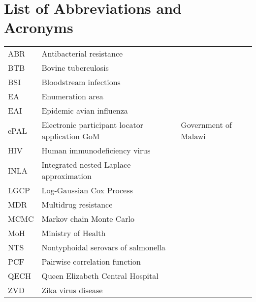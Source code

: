 
\chapter*{List of Abbreviations and Acronyms}

\begin{table}[H]
 \renewcommand{\arraystretch}{1.5}
\begin{tabular}{l l l}
ABR & Antibacterial resistance\\
BTB & Bovine tuberculosis\\
BSI &  Bloodstream infections\\
EA & Enumeration area\\
EAI & Epidemic avian influenza\\
ePAL & Electronic participant locator application
GoM & Government of Malawi\\
HIV & Human immunodeficiency virus\\
INLA & Integrated nested Laplace approximation\\
LGCP &  Log-Gaussian Cox Process\\
MDR & Multidrug resistance\\
MCMC & Markov chain Monte Carlo\\
MoH & Ministry of Health\\
NTS & Nontyphoidal serovars of salmonella\\
PCF & Pairwise correlation function\\
QECH & Queen Elizabeth Central Hospital\\
ZVD & Zika virus disease\\
\end{tabular}
\end{table}


\newpage
